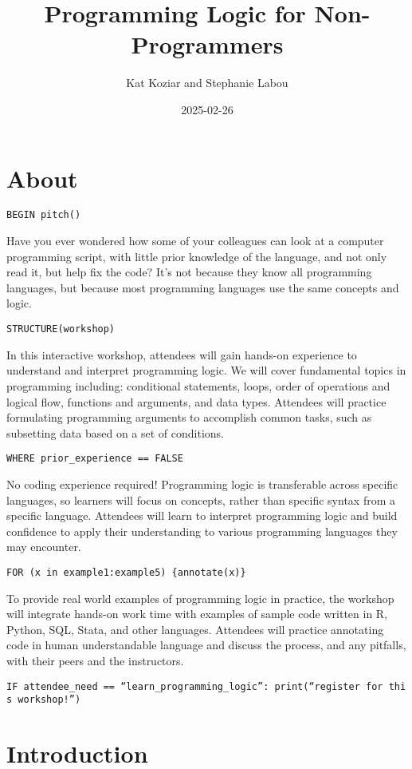 \documentclass[
]{book}
\title{Programming Logic for Non-Programmers}
\author{Kat Koziar and Stephanie Labou}
\date{2025-02-26}
\begin{document}
\maketitle

{
\setcounter{tocdepth}{1}
\tableofcontents
}
\chapter{About}\label{about}

\texttt{BEGIN\ pitch()}

Have you ever wondered how some of your colleagues can look at a computer programming script, with little prior knowledge of the language, and not only read it, but help fix the code? It's not because they know all programming languages, but because most programming languages use the same concepts and logic.

\texttt{STRUCTURE(workshop)}

In this interactive workshop, attendees will gain hands-on experience to understand and interpret programming logic. We will cover fundamental topics in programming including: conditional statements, loops, order of operations and logical flow, functions and arguments, and data types. Attendees will practice formulating programming arguments to accomplish common tasks, such as subsetting data based on a set of conditions.

\texttt{WHERE\ prior\_experience\ ==\ FALSE}

No coding experience required! Programming logic is transferable across specific languages, so learners will focus on concepts, rather than specific syntax from a specific language. Attendees will learn to interpret programming logic and build confidence to apply their understanding to various programming languages they may encounter.

\texttt{FOR\ (x\ in\ example1:example5)\ \{annotate(x)\}}

To provide real world examples of programming logic in practice, the workshop will integrate hands-on work time with examples of sample code written in R, Python, SQL, Stata, and other languages. Attendees will practice annotating code in human understandable language and discuss the process, and any pitfalls, with their peers and the instructors.

\texttt{IF\ attendee\_need\ ==\ “learn\_programming\_logic”:\ print(“register\ for\ this\ workshop!”)}

\chapter{Introduction}\label{intro}
\end{document}
